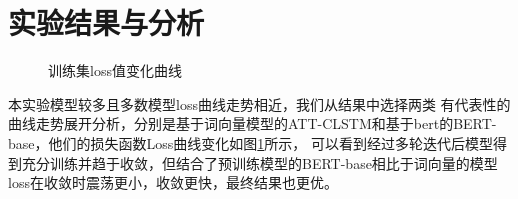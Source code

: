 \section{实验结果与分析}

\begin{figure}[htbp]
  \caption{训练集loss值变化曲线}
  \label{fig:loss}
  \end{figure}

本实验模型较多且多数模型loss曲线走势相近，我们从结果中选择两类
有代表性的曲线走势展开分析，分别是基于词向量模型的ATT-CLSTM和基于bert的BERT-base，他们的损失函数Loss曲线变化如图\ref{fig:loss}所示，
可以看到经过多轮迭代后模型得到充分训练并趋于收敛，但结合了预训练模型的BERT-base相比于词向量的模型loss在收敛时震荡更小，收敛更快，最终结果也更优。

